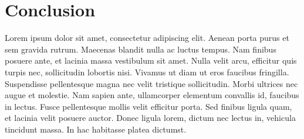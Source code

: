 \documentclass[sigconf,natbib=false]{acmart}
\begin{document}

\section{Conclusion}

Lorem ipsum dolor sit amet, consectetur adipiscing elit. Aenean porta purus et
sem gravida rutrum. Maecenas blandit nulla ac luctus tempus. Nam finibus
posuere ante, et lacinia massa vestibulum sit amet. Nulla velit arcu, efficitur
quis turpis nec, sollicitudin lobortis nisi. Vivamus ut diam ut eros faucibus
fringilla. Suspendisse pellentesque magna nec velit tristique sollicitudin.
Morbi ultrices nec augue et molestie. Nam sapien ante, ullamcorper elementum
convallis id, faucibus in lectus. Fusce pellentesque mollis velit efficitur
porta. Sed finibus ligula quam, et lacinia velit posuere auctor. Donec ligula
lorem, dictum nec lectus in, vehicula tincidunt massa. In hac habitasse platea
dictumst.


\printbibliography%
\end{document}

